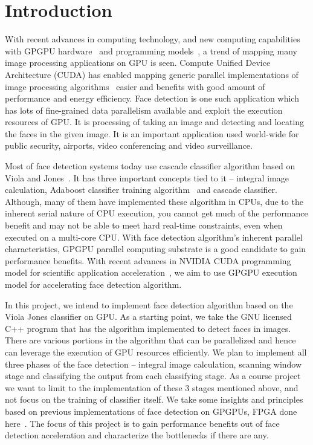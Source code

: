 \section{Introduction}\label{sec:intro}

With recent advances in computing technology, and new computing capabilities
with GPGPU hardware~\cite{owens2008gpu} and programming models~\cite{nvidia2007compute}, 
a trend of mapping many image processing applications on GPU is seen. 
Compute Unified Device Architecture (CUDA) has enabled mapping generic parallel
implementations of image processing algorithms~\cite{yang2008parallel} easier and benefits with good amount of 
performance and energy efficiency. 
Face detection is one such application which has lots of fine-grained
data parallelism available and exploit the execution resources of GPU.
It is processing of taking an image and detecting and locating the faces 
in the given image. It is an important application used world-wide for
public security, airports, video conferencing and video surveillance. 

Most of face detection systems today use cascade classifier algorithm 
based on Viola and Jones~\cite{viola2001rapid}. It has three important 
concepts tied to it -- integral image calculation, Adaboost classifier training
algorithm~\cite{freund1999short} and cascade classifier.  
Although, many of them have implemented these algorithm in CPUs, due to 
the inherent serial nature of CPU execution, you cannot get much of the
performance benefit and may not be able to meet hard real-time constraints,
even when executed on a multi-core CPU. 
With face detection algorithm's inherent parallel characteristics, GPGPU 
parallel computing substrate is a good candidate to gain performance benefits. 
With recent advances in NVIDIA CUDA programming model for scientific application 
acceleration~\cite{buck2007gpu}, we aim to use GPGPU execution model for accelerating face detection algorithm.

In this project, we intend to implement face detection algorithm 
based on the Viola Jones classifier on GPU. 
As a starting point, we take the GNU licensed C++ program that has the 
algorithm implemented to detect faces in images. 
There are various portions in the algorithm that 
can be parallelized and hence can leverage the execution of GPU resources efficiently. 
We plan to implement all three phases of the face detection -- integral image calculation,
scanning window stage and classifying the output from each classifying stage. 
As a course project we want to limit to the implementation of these 3 stages mentioned above, 
and not focus on the training of classifier itself. We take some insights and principles
based on previous implementations of face detection on GPGPUs, FPGA done here~\cite{kong2010gpu, sun2013acceleration, cho2009fpga}.
The focus of this project is
to gain performance benefits out of face detection acceleration and characterize
the bottlenecks if there are any. 

